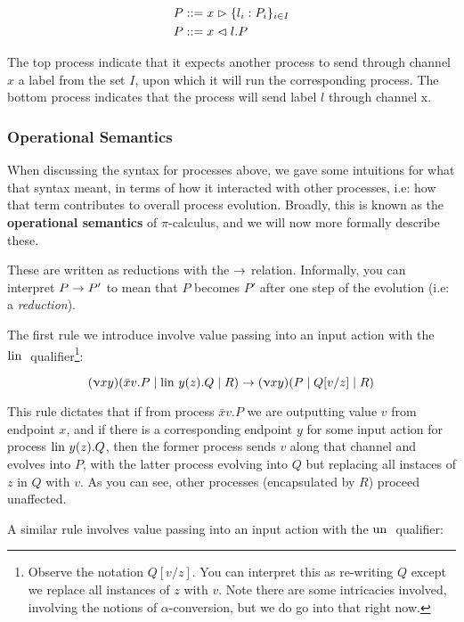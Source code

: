 \begin{align*}
    P &::= x \vartriangleright \{l_i : P_i\}_{i \in I} \\
    P &::= x \vartriangleleft l.P 
\end{align*}

The top process indicate that it expects another process to send through channel $x$ a label from the set $I$, upon which it will run the corresponding process. The bottom process indicates that the process will send label $l$ through channel x.


\subsubsection{Operational Semantics}

When discussing the syntax for processes above, we gave some intuitions for what that syntax meant, in terms of how it interacted with other processes, i.e: how that term contributes to overall process evolution. Broadly, this is known as the \textbf{operational semantics} of $\pi$-calculus, and we will now more formally describe these.

These are written as reductions with the $\rightarrow$ relation. Informally, you can interpret $P \rightarrow P'$ to mean that $P$ becomes $P'$ after one step of the evolution (i.e: a \textit{reduction}).

The first rule we introduce involve value passing into an input action with the $\text{lin }$ qualifier\footnote{Observe the notation $Q[v/z]$. You can interpret this as re-writing $Q$ except we replace all instances of $z$ with $v$. Note there are some intricacies involved, involving the notions of $\alpha$-conversion, but we do go into that right now.}:

$$(\upnu xy)(\bar{x}v.P \mid \text{lin } y(z).Q \mid R) \rightarrow (\upnu xy)(P \mid Q[v/z]\mid R)$$

This rule dictates that if from process $\bar{x}v.P$ we are outputting value $v$ from endpoint $x$, and if there is a corresponding endpoint $y$ for some input action for process $\text{lin } y(z).Q$, then the former process sends $v$ along that channel and evolves into $P$, with the latter process evolving into $Q$ but replacing all instaces of $z$ in $Q$ with $v$. As you can see, other processes (encapsulated by $R$) proceed unaffected.

A similar rule involves value passing into an input action with the $\text{un }$ qualifier:

